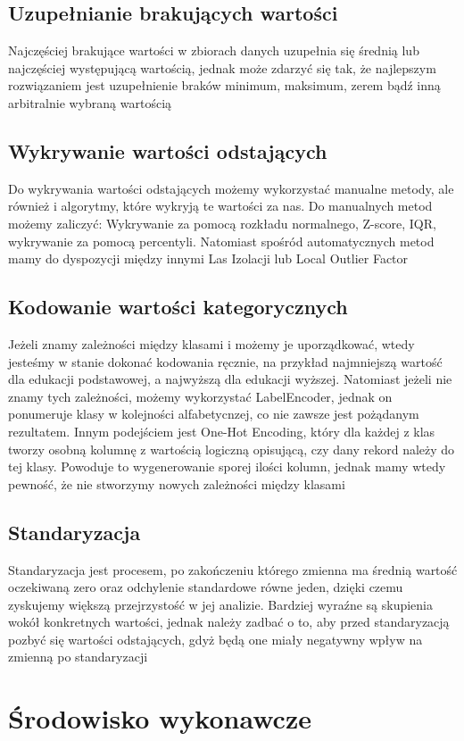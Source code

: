\documentclass{article}
\begin{document}
\subsection{Uzupełnianie brakujących wartości}
Najczęściej brakujące wartości w zbiorach danych uzupełnia się średnią lub najczęściej występującą wartością, jednak może zdarzyć się tak, 
że najlepszym rozwiązaniem jest uzupełnienie braków minimum, maksimum, 
zerem bądź inną arbitralnie wybraną wartością
\subsection{Wykrywanie wartości odstających}
Do wykrywania wartości odstających możemy wykorzystać manualne metody, ale również i algorytmy, które wykryją te wartości za nas. 
Do manualnych metod możemy zaliczyć: Wykrywanie za pomocą rozkładu normalnego, Z-score, IQR, wykrywanie za pomocą percentyli. 
Natomiast spośród automatycznych metod mamy do dyspozycji między innymi Las Izolacji lub Local Outlier Factor
\subsection{Kodowanie wartości kategorycznych}
Jeżeli znamy zależności między klasami i możemy je uporządkować, wtedy jesteśmy w stanie dokonać kodowania ręcznie, na przykład najmniejszą wartość dla edukacji podstawowej, a najwyższą dla edukacji wyższej. Natomiast jeżeli nie znamy tych zależności, możemy wykorzystać LabelEncoder, jednak on ponumeruje klasy w kolejności alfabetycnzej, co nie zawsze jest pożądanym rezultatem. Innym podejściem jest One-Hot Encoding, który dla każdej z klas tworzy osobną kolumnę z wartością logiczną opisującą, czy dany rekord należy do tej klasy. Powoduje to wygenerowanie sporej ilości kolumn, jednak mamy wtedy pewność, że nie stworzymy nowych zależności między klasami
\subsection{Standaryzacja}
Standaryzacja jest procesem, po zakończeniu którego zmienna ma średnią wartość oczekiwaną zero oraz odchylenie standardowe równe jeden, 
dzięki czemu zyskujemy większą przejrzystość w jej analizie. Bardziej wyraźne są skupienia wokół konkretnych wartości, jednak należy zadbać o to, aby przed standaryzacją pozbyć się wartości odstających, gdyż będą one miały negatywny wpływ na zmienną po standaryzacji



\section{Środowisko wykonawcze}
\end{document}
